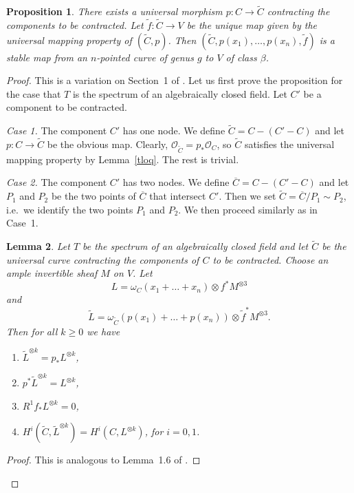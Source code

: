 \documentclass[11pt]{amsart}
\newtheorem{prop}{Proposition}[section]
\newtheorem{lem}[prop]{Lemma}
\theoremstyle{definition}
\theoremstyle{remark}
\newenvironment{pf}{\begin{proof}}{\end{proof}}
\renewcommand{\tilde}{\widetilde}
\newcommand{\upst}{^{\ast}}
\newcommand{\lst}{_{\ast}}
\renewcommand{\O}{{\mathcal{O}}}
\newcommand{\ol}{\overline}
\theoremstyle{plain}
\theoremstyle{definition}
\theoremstyle{remark}
\begin{document}
\begin{prop} \label{cae}
There exists a universal morphism \(p:C\rightarrow\tilde{C}\) contracting the
components to be contracted. Let
\(\tilde{f}:\tilde{C}\rightarrow V\) be the unique map given by the universal
mapping property of \((\tilde{C},p)\). Then
\((\tilde{C},p(x_1),\ldots, p(x_n),\tilde{f})\) is a stable map from an
\(n\)-pointed curve of genus \(g\) to \(V\) of class
\(\beta\).
\end{prop}
\begin{pf}
This is a variation on Section~1 of \cite{knudsen}.  Let us first prove the
proposition for the case that
\(T\) is the spectrum of an algebraically closed field. Let \(C'\) be a component
to be contracted.

{\em Case 1. }The component \(C'\) has one node. We define \(\tilde{C}=C-(C'-C)\)
and let \(p:C\rightarrow \tilde{C}\) be the
obvious map. Clearly, \(\O_{\tilde{C}}=p\lst\O_C\), so \(\tilde{C}\) satisfies the
universal mapping property by
Lemma~\ref{tloq}. The rest is trivial.

{\em Case 2. }The component \(C'\) has two nodes. We define \(\ol{C}=C-(C'-C)\) and
let \(P_1\) and \(P_2\) be the two points of
\(\ol{C}\) that intersect \(C'\). Then we set \(\tilde{C}=\ol{C}/P_1\sim P_2\), i.e.\
we identify the two points \(P_1\) and
\(P_2\). We then proceed similarly as in Case~1.

\begin{lem} \label{clocct}
Let \(T\) be the spectrum of an algebraically closed field and let \(\tilde{C}\) be
the universal curve contracting the
components of \(C\) to be contracted.  Choose an ample invertible sheaf \(M\) on
\(V\). Let
\[
L=\omega_C(x_1+\ldots+x_n)\otimes f\upst M^{\otimes3}
\]
and
\[
\tilde{L}=\omega_{\tilde{C}}(p(x_1)+\ldots+p(x_n))\otimes \tilde{f}\upst
M^{\otimes3}.
\]
Then for all \(k\geq0\) we have
\begin{enumerate}
\item \(\tilde{L}^{\otimes k}=p\lst L^{\otimes k}\),
\item \(p\upst \tilde{L}^{\otimes k}={L}^{\otimes k}\),
\item \(R^1f\lst  L^{\otimes k}=0\),
\item \(H^i(\tilde{C},\tilde{L}^{\otimes k})=H^i(C,L^{\otimes k})\), for \(i=0,1\).
\end{enumerate}
\end{lem}
\begin{pf}
This is analogous to Lemma~1.6 of \cite{knudsen}.
\end{pf}


\end{pf}
\end{document}
